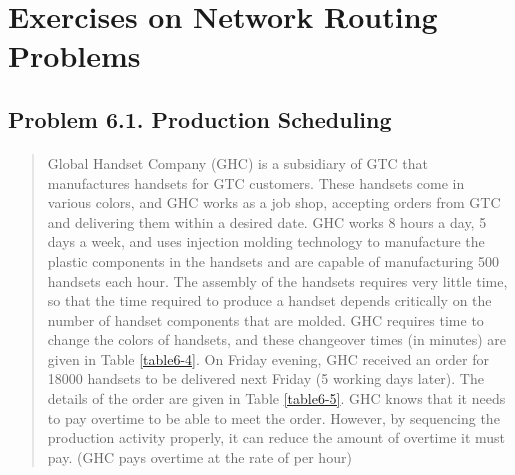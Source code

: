 \section{Exercises on Network Routing Problems}

\subsection{Problem 6.1. Production Scheduling}

\paragraph{}
\begin{quote}
Global Handset Company (GHC) is a subsidiary of GTC that manufactures handsets for GTC customers. These handsets come in various colors, and GHC works as a job shop, accepting orders from GTC and delivering them within a desired date. GHC works 8 hours a day, 5 days a week, and uses injection molding technology to manufacture the plastic components in the handsets and are capable of manufacturing 500 handsets each hour. The assembly of the handsets requires very little time, so that the time required to produce a handset depends critically on the number of handset components that are molded. GHC requires time to change the colors of handsets, and these changeover times (in minutes) are given in Table \ref{table6-4}. On Friday evening, GHC received an order for 18000 handsets to be delivered next Friday (5 working days later). The details of the order are given in Table \ref{table6-5}. GHC knows that it needs to pay overtime to be able to meet the order. However, by sequencing the production activity properly, it can reduce the amount of overtime it must pay. (GHC pays overtime at the rate of  per hour)
\end{quote}

